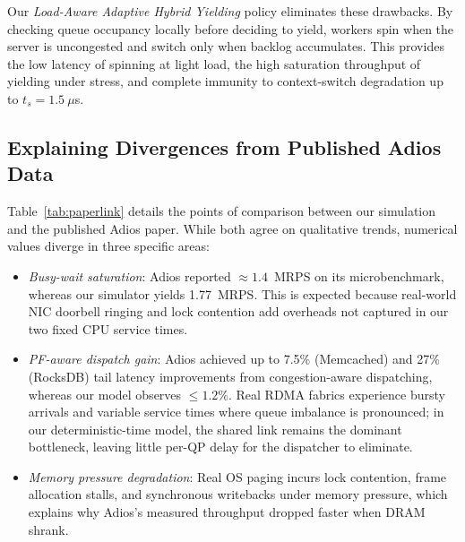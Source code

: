 Our \emph{Load-Aware Adaptive Hybrid Yielding} policy eliminates these drawbacks. By checking queue occupancy locally before deciding to yield, workers spin when the server is uncongested and switch only when backlog accumulates. This provides the low latency of spinning at light load, the high saturation throughput of yielding under stress, and complete immunity to context-switch degradation up to $t_s = 1.5~\mu$s.

\subsection{Explaining Divergences from Published Adios Data}
Table~\ref{tab:paperlink} details the points of comparison between our simulation and the published Adios paper. While both agree on qualitative trends, numerical values diverge in three specific areas:
\begin{itemize}
\item \emph{Busy-wait saturation}: Adios reported $\approx 1.4$~MRPS on its microbenchmark, whereas our simulator yields 1.77~MRPS. This is expected because real-world NIC doorbell ringing and lock contention add overheads not captured in our two fixed CPU service times.
\item \emph{PF-aware dispatch gain}: Adios achieved up to 7.5\% (Memcached) and 27\% (RocksDB) tail latency improvements from congestion-aware dispatching, whereas our model observes $\le 1.2\%$. Real RDMA fabrics experience bursty arrivals and variable service times where queue imbalance is pronounced; in our deterministic-time model, the shared link remains the dominant bottleneck, leaving little per-QP delay for the dispatcher to eliminate.
\item \emph{Memory pressure degradation}: Real OS paging incurs lock contention, frame allocation stalls, and synchronous writebacks under memory pressure, which explains why Adios's measured throughput dropped faster when DRAM shrank.
\end{itemize}

